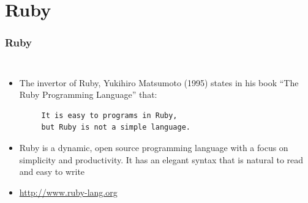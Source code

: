 \documentclass{beamer}
\begin{document}
\section{Ruby}
\begin{frame}[fragile]
\frametitle{Ruby}
\begin{columns}
 \begin{itemize}
  \item The invertor of Ruby, Yukihiro Matsumoto (1995) states in his book ``The Ruby Programming Language'' that:
  \begin{verbatim}
     It is easy to programs in Ruby,
     but Ruby is not a simple language.
  \end{verbatim} 
  \item Ruby is a dynamic, open source programming language with a focus on simplicity and productivity. It has an elegant syntax that is natural to read and easy to write

  \item \url{http://www.ruby-lang.org}
 \end{itemize}

\end{columns}

\end{frame}
\end{document}
